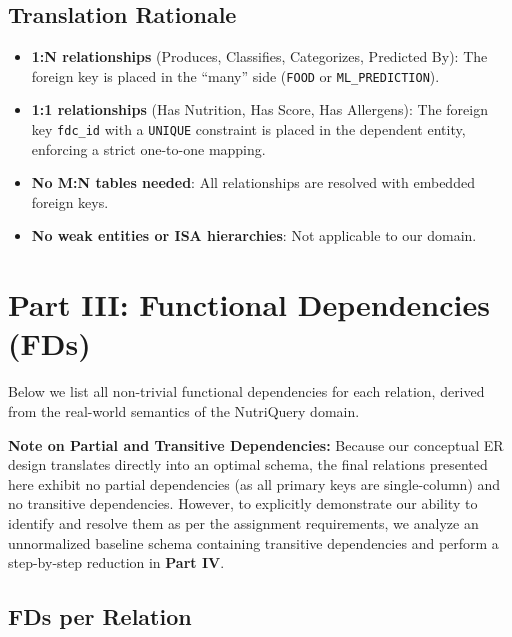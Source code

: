 \documentclass[12pt,a4paper]{article}
\begin{document}
\subsection{Translation Rationale}
\begin{itemize}
  \item \textbf{1:N relationships} (Produces, Classifies, Categorizes, Predicted By): The foreign key is placed in the ``many'' side (\texttt{FOOD} or \texttt{ML\_PREDICTION}).
  \item \textbf{1:1 relationships} (Has Nutrition, Has Score, Has Allergens): The foreign key \texttt{fdc\_id} with a \texttt{UNIQUE} constraint is placed in the dependent entity, enforcing a strict one-to-one mapping.
  \item \textbf{No M:N tables needed}: All relationships are resolved with embedded foreign keys.
  \item \textbf{No weak entities or ISA hierarchies}: Not applicable to our domain.
\end{itemize}

\section{Part III: Functional Dependencies (FDs)}

Below we list all non-trivial functional dependencies for each relation, derived from the real-world semantics of the NutriQuery domain.

\textbf{Note on Partial and Transitive Dependencies:} Because our conceptual ER design translates directly into an optimal schema, the final relations presented here exhibit no partial dependencies (as all primary keys are single-column) and no transitive dependencies. However, to explicitly demonstrate our ability to identify and resolve them as per the assignment requirements, we analyze an unnormalized baseline schema containing transitive dependencies and perform a step-by-step reduction in \textbf{Part IV}.

\subsection{FDs per Relation}
\end{document}
